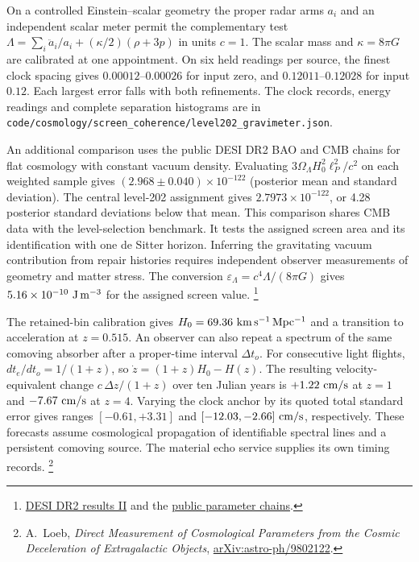 \documentclass[11pt]{article}
\theoremstyle{remark}
\theoremstyle{plain}
\begin{document}
On a controlled Einstein--scalar geometry the proper radar arms $a_i$
and an independent scalar meter permit the complementary test
$\Lambda=\sum_i \ddot a_i/a_i+(\kappa/2)(\rho+3p)$ in units $c=1$.
The scalar mass and $\kappa=8\pi G$ are calibrated at one appointment.
On six held readings per source, the finest clock spacing gives
$0.00012$--$0.00026$ for input zero, and $0.12011$--$0.12028$ for
input $0.12$. Each largest error falls with both refinements.
The clock records, energy readings and complete separation histograms
are in \nolinkurl{code/cosmology/screen_coherence/level202_gravimeter.json}.

An additional comparison uses the public DESI DR2 BAO and CMB chains for
flat cosmology with constant vacuum density. Evaluating
$3\Omega_\Lambda H_0^2\ell_P^2/c^2$ on each weighted sample gives
$(2.968\pm0.040)\times10^{-122}$ (posterior mean and standard deviation).
The central level-202 assignment gives $2.7973\times10^{-122}$, or 4.28
posterior standard deviations below that mean. This comparison shares CMB
data with the level-selection benchmark. It tests the assigned screen area
and its identification with one de Sitter horizon. Inferring the gravitating
vacuum contribution from repair histories requires independent observer
measurements of geometry and matter stress. The conversion
$\varepsilon_\Lambda=c^4\Lambda/(8\pi G)$ gives
$5.16\times 10^{-10}\ {\rm J\,m^{-3}}$ for the assigned screen value.%
\footnote{\href{https://arxiv.org/abs/2503.14738}{DESI DR2 results II} and
the \href{https://data.desi.lbl.gov/public/papers/y3/bao-cosmo-params/README.html}{public parameter chains}.}

The retained-bin calibration gives $H_0=69.36\ {\rm km\,s^{-1}\,Mpc^{-1}}$
and a transition to acceleration at $z=0.515$.
An observer can also repeat a spectrum of the same comoving absorber
after a proper-time interval $\Delta t_o$. For consecutive light flights,
$dt_e/dt_o=1/(1+z)$, so $\dot z=(1+z)H_0-H(z)$. The resulting
velocity-equivalent change $c\,\Delta z/(1+z)$ over ten Julian years
is $+1.22\ {\rm cm/s}$ at $z=1$ and $-7.67\ {\rm cm/s}$ at $z=4$.
Varying the clock anchor by its quoted total standard error gives ranges
$[-0.61,+3.31]$ and $[-12.03,-2.66]\ {\rm cm/s}$, respectively.
These forecasts assume cosmological propagation of identifiable spectral
lines and a persistent comoving source. The material echo service supplies
its own timing records.%
\footnote{A.~Loeb, \emph{Direct Measurement of Cosmological Parameters
from the Cosmic Deceleration of Extragalactic Objects},
\href{https://arxiv.org/abs/astro-ph/9802122}{arXiv:astro-ph/9802122}.}
\end{document}
